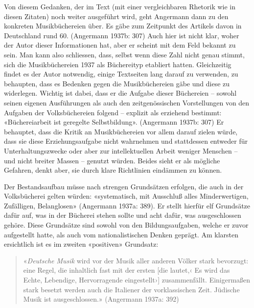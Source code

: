 \documentclass[a4paper,
fontsize=11pt,
oneside,
numbers=noperiodatend,
parskip=half-,
bibliography=totoc,
final
]{scrartcl}
\begin{document}
Von diesem Gedanken, der im Text (mit einer vergleichbaren Rhetorik wie
in diesen Zitaten) noch weiter ausgeführt wird, geht Angermann dann zu
den konkreten Musikbüchereien über. Es gäbe zum Zeitpunkt des Artikels
davon in Deutschland rund 60. (Angermann 1937b: 307) Auch hier ist nicht
klar, woher der Autor dieser Informationen hat, aber er scheint mit dem
Feld bekannt zu sein. Man kann also schliessen, dass, selbst wenn diese
Zahl nicht genau stimmt, sich die Musikbüchereien 1937 als Büchereityp
etabliert hatten. Gleichzeitig findet es der Autor notwendig, einige
Textseiten lang darauf zu verwenden, zu behaupten, dass es Bedenken
gegen die Musikbüchereien gäbe und diese zu widerlegen. Wichtig ist
dabei, dass er die Aufgabe dieser Büchereien -- sowohl seinen eigenen
Ausführungen als auch den zeitgenössischen Vorstellungen von den
Aufgaben der Volksbüchereien folgend -- explizit als erziehend bestimmt:
«Büchereiarbeit ist geregelte Selbstbildung». (Angermann 1937b: 307) Er
behauptet, dass die Kritik an Musikbüchereien vor allem darauf zielen
würde, dass sie diese Erziehungsaufgabe nicht wahrnehmen und stattdessen
entweder für Unterhaltungszwecke oder aber zur intellektuellen Arbeit
weniger Menschen -- und nicht breiter Massen -- genutzt würden. Beides
sieht er als mögliche Gefahren, denkt aber, sie durch klare Richtlinien
eindämmen zu können.

Der Bestandsaufbau müsse nach strengen Grundsätzen erfolgen, die auch in
der Volksbücherei gelten würden: «systematisch, mit Ausschluß alles
Minderwertigen, Zufälligen, Belanglosen» (Angermann 1937a: 389). Er
stellt hierfür elf Grundsätze dafür auf, was in der Bücherei stehen
sollte und acht dafür, was ausgeschlossen gehöre. Diese Grundsätze sind
sowohl von den Bildungsaufgaben, welche er zuvor aufgestellt hatte, als
auch vom nationalistischen Denken geprägt. Am klarsten ersichtlich ist
es im zweiten «positiven» Grundsatz:

\begin{quote}
«\emph{Deutsche Musik} wird vor der Musik aller anderen Völker stark
bevorzugt: eine Regel, die inhaltlich fast mit der ersten {[}die
lautet,‹ Es wird das Echte, Lebendige, Hervorragende eingestellt›{]}
zusammenfällt. Einigermaßen stark besetzt werden auch die Italiener der
vorklassischen Zeit. Jüdische Musik ist ausgeschlossen.» (Angermann
1937a: 392)
\end{quote}
\end{document}
